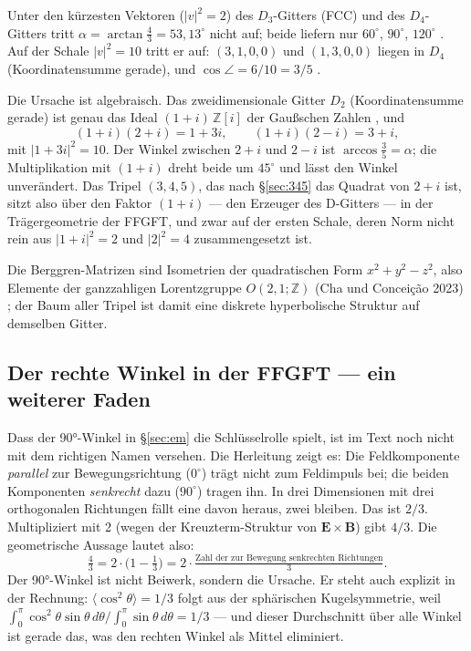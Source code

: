 Unter den kürzesten Vektoren ($|v|^2=2$) des $D_3$-Gitters (FCC) und des
$D_4$-Gitters tritt $\alpha = \arctan\tfrac43 = 53{,}13^\circ$ nicht auf;
beide liefern nur $60^\circ$, $90^\circ$, $120^\circ$ \XM. Auf der Schale
$|v|^2 = 10$ tritt er auf: $(3,1,0,0)$ und $(1,3,0,0)$ liegen in $D_4$
(Koordinatensumme gerade), und $\cos\angle = 6/10 = 3/5$ \BM.

Die Ursache ist algebraisch. Das zweidimensionale Gitter $D_2$ (Koordinatensumme
gerade) ist genau das Ideal $(1+i)\,\mathbb Z[i]$ der Gaußschen Zahlen \BM, und
\begin{equation}
  (1+i)(2+i) = 1+3i, \qquad (1+i)(2-i) = 3+i,
\end{equation}
mit $|1+3i|^2 = 10$. Der Winkel zwischen $2+i$ und $2-i$ ist $\arccos\tfrac35
= \alpha$; die Multiplikation mit $(1+i)$ dreht beide um $45^\circ$ und
lässt den Winkel unverändert. Das Tripel $(3,4,5)$, das nach §\ref{sec:345}
das Quadrat von $2+i$ ist, sitzt also über den Faktor $(1+i)$ --- den Erzeuger
des D-Gitters --- in der Trägergeometrie der FFGFT, und zwar auf der ersten
Schale, deren Norm nicht rein aus $|1+i|^2=2$ und $|2|^2=4$ zusammengesetzt ist.

Die Berggren-Matrizen sind Isometrien der quadratischen Form $x^2+y^2-z^2$,
also Elemente der ganzzahligen Lorentzgruppe $O(2,1;\mathbb Z)$ (Cha und
Conceição 2023) \EM; der Baum aller Tripel ist damit eine diskrete
hyperbolische Struktur auf demselben Gitter.


\subsection{Der rechte Winkel in der FFGFT --- ein weiterer Faden \SM}

Dass der 90°-Winkel in §\ref{sec:em} die Schlüsselrolle spielt, ist im Text
noch nicht mit dem richtigen Namen versehen. Die Herleitung zeigt es: Die
Feldkomponente \emph{parallel} zur Bewegungsrichtung ($0^\circ$) trägt nicht
zum Feldimpuls bei; die beiden Komponenten \emph{senkrecht} dazu ($90^\circ$)
tragen ihn. In drei Dimensionen mit drei orthogonalen Richtungen fällt eine
davon heraus, zwei bleiben. Das ist $2/3$. Multipliziert mit 2 (wegen der
Kreuzterm-Struktur von $\mathbf E\times\mathbf B$) gibt $4/3$. Die geometrische
Aussage lautet also:
\begin{equation}
  \tfrac43 = 2 \cdot \bigl(1 - \tfrac13\bigr) = 2 \cdot \tfrac{\text{Zahl der zur Bewegung senkrechten Richtungen}}{3}.
\end{equation}
Der 90°-Winkel ist nicht Beiwerk, sondern die Ursache. Er steht auch explizit
in der Rechnung: $\langle\cos^2\theta\rangle = 1/3$ folgt aus der sphärischen
Kugelsymmetrie, weil $\int_0^\pi \cos^2\theta\sin\theta\,d\theta / \int_0^\pi\sin\theta\,d\theta = 1/3$ ---
und dieser Durchschnitt über alle Winkel ist gerade das, was den rechten Winkel
als Mittel eliminiert.

